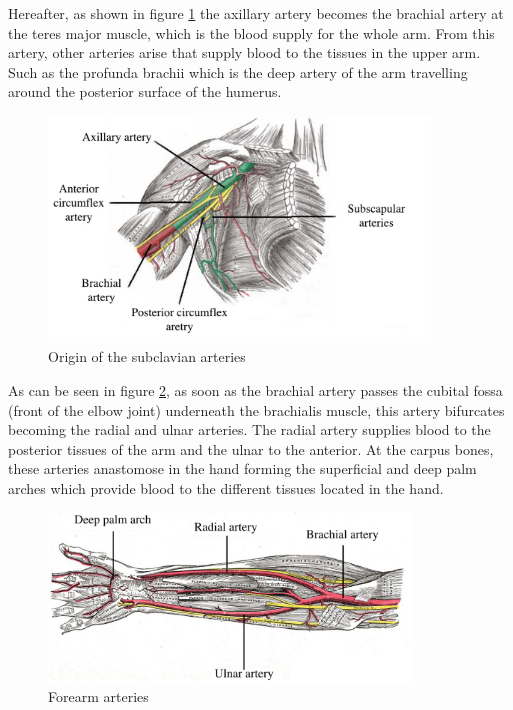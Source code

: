 Hereafter, as shown in figure \ref{fig:upper arm circulation} the axillary artery becomes the brachial artery at the teres major muscle, which is the blood supply for the whole arm.  From this artery, other arteries arise that supply blood to the tissues in the upper arm. Such as the profunda brachii which is the deep artery of the arm travelling around the posterior surface of the humerus. 

\begin{figure}[!htpb]
	\centering
	\includegraphics[height=6cm,keepaspectratio]{figure19}
	\caption{Origin of the subclavian arteries}
	\label{fig:upper arm circulation}
\end{figure}

As can be seen in figure \ref{fig:forearm aretries}, as soon as the brachial artery passes the cubital fossa (front of the elbow joint) underneath the brachialis muscle, this artery bifurcates becoming the radial and ulnar arteries. The radial artery supplies blood to the posterior tissues of the arm and the ulnar to the anterior. At the carpus bones, these arteries anastomose in the hand forming the superficial and deep palm arches which provide blood to the different tissues located in the hand. 

\begin{figure}[!htpb]
	\centering
	\includegraphics[height=4.5cm,keepaspectratio]{figure20}
	\caption{Forearm arteries}
	\label{fig:forearm aretries}
\end{figure}

